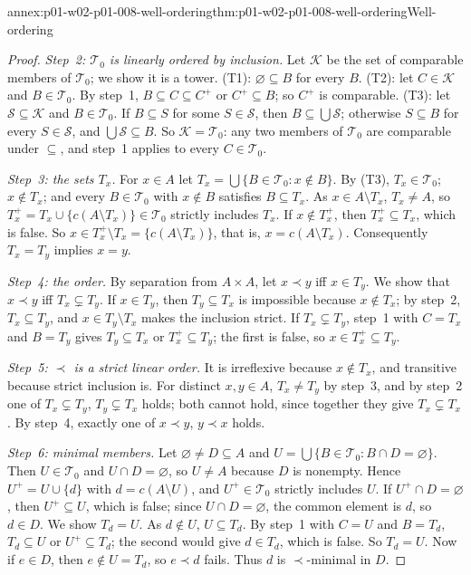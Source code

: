 \begin{annexitem}{annex:p01-w02-p01-008-well-ordering}{thm:p01-w02-p01-008-well-ordering}{Well-ordering}
\begin{proof}
\emph{Step~2: \(\mathcal T_0\) is linearly ordered by inclusion.} Let
\(\mathcal K\) be the set of comparable members of \(\mathcal T_0\); we show
it is a tower. (T1): \(\varnothing\subseteq B\) for every \(B\). (T2): let
\(C\in\mathcal K\) and \(B\in\mathcal T_0\). By step~1, \(B\subseteq C\subseteq
C^{+}\) or \(C^{+}\subseteq B\); so \(C^{+}\) is comparable. (T3): let
\(\mathcal S\subseteq\mathcal K\) and \(B\in\mathcal T_0\). If
\(B\subseteq S\) for some \(S\in\mathcal S\), then
\(B\subseteq\bigcup\mathcal S\); otherwise \(S\subseteq B\) for every
\(S\in\mathcal S\), and \(\bigcup\mathcal S\subseteq B\). So
\(\mathcal K=\mathcal T_0\): any two members of \(\mathcal T_0\) are
comparable under \(\subseteq\), and step~1 applies to every
\(C\in\mathcal T_0\).

\emph{Step~3: the sets \(T_x\).} For \(x\in A\) let
\(T_x=\bigcup\{B\in\mathcal T_0:x\notin B\}\). By (T3),
\(T_x\in\mathcal T_0\); \(x\notin T_x\); and every \(B\in\mathcal T_0\) with
\(x\notin B\) satisfies \(B\subseteq T_x\). As \(x\in A\setminus T_x\),
\(T_x\neq A\), so \(T_x^{+}=T_x\cup\{c(A\setminus T_x)\}\in\mathcal T_0\)
strictly includes \(T_x\). If \(x\notin T_x^{+}\), then
\(T_x^{+}\subseteq T_x\), which is false. So
\(x\in T_x^{+}\setminus T_x=\{c(A\setminus T_x)\}\), that is,
\(x=c(A\setminus T_x)\). Consequently \(T_x=T_y\) implies \(x=y\).

\emph{Step~4: the order.} By separation from \(A\times A\), let \(x\prec y\)
iff \(x\in T_y\). We show that \(x\prec y\) iff \(T_x\subsetneq T_y\). If
\(x\in T_y\), then \(T_y\subseteq T_x\) is impossible because
\(x\notin T_x\); by step~2, \(T_x\subseteq T_y\), and \(x\in T_y\setminus T_x\)
makes the inclusion strict. If \(T_x\subsetneq T_y\), step~1 with \(C=T_x\)
and \(B=T_y\) gives \(T_y\subseteq T_x\) or \(T_x^{+}\subseteq T_y\); the
first is false, so \(x\in T_x^{+}\subseteq T_y\).

\emph{Step~5: \(\prec\) is a strict linear order.} It is irreflexive
because \(x\notin T_x\), and transitive because strict inclusion is. For
distinct \(x,y\in A\), \(T_x\neq T_y\) by step~3, and by step~2 one of
\(T_x\subsetneq T_y\), \(T_y\subsetneq T_x\) holds; both cannot hold, since
together they give \(T_x\subsetneq T_x\). By step~4, exactly one of
\(x\prec y\), \(y\prec x\) holds.

\emph{Step~6: minimal members.} Let \(\varnothing\neq D\subseteq A\) and
\(U=\bigcup\{B\in\mathcal T_0:B\cap D=\varnothing\}\). Then
\(U\in\mathcal T_0\) and \(U\cap D=\varnothing\), so \(U\neq A\) because
\(D\) is nonempty. Hence \(U^{+}=U\cup\{d\}\) with \(d=c(A\setminus U)\),
and \(U^{+}\in\mathcal T_0\) strictly includes \(U\). If
\(U^{+}\cap D=\varnothing\), then \(U^{+}\subseteq U\), which is false;
since \(U\cap D=\varnothing\), the common element is \(d\), so \(d\in D\).
We show \(T_d=U\). As \(d\notin U\), \(U\subseteq T_d\). By step~1 with
\(C=U\) and \(B=T_d\), \(T_d\subseteq U\) or \(U^{+}\subseteq T_d\); the
second would give \(d\in T_d\), which is false. So \(T_d=U\). Now if
\(e\in D\), then \(e\notin U=T_d\), so \(e\prec d\) fails. Thus \(d\) is
\(\prec\)-minimal in \(D\).


\end{proof}
\end{annexitem}
